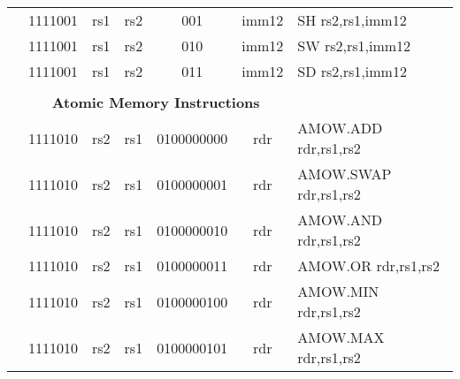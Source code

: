 \begin{table}[p]
\begin{small}
\begin{center}
\begin{tabular}{rcccccccccl}
&
\multicolumn{2}{|c|}{1111001} &
\multicolumn{1}{c|}{rs1} &
\multicolumn{1}{c|}{rs2} &
\multicolumn{1}{c|}{001} &
\multicolumn{4}{c|}{imm12} & SH rs2,rs1,imm12 \\
\cline{2-10}
  

&
\multicolumn{2}{|c|}{1111001} &
\multicolumn{1}{c|}{rs1} &
\multicolumn{1}{c|}{rs2} &
\multicolumn{1}{c|}{010} &
\multicolumn{4}{c|}{imm12} & SW rs2,rs1,imm12 \\
\cline{2-10}
  

&
\multicolumn{2}{|c|}{1111001} &
\multicolumn{1}{c|}{rs1} &
\multicolumn{1}{c|}{rs2} &
\multicolumn{1}{c|}{011} &
\multicolumn{4}{c|}{imm12} & SD rs2,rs1,imm12 \\
\cline{2-10}
  

&
\multicolumn{9}{c}{} & \\
&
\multicolumn{9}{c}{\bf Atomic Memory Instructions} & \\
\cline{2-10}
  

&
\multicolumn{2}{|c|}{1111010} &
\multicolumn{1}{c|}{rs2} &
\multicolumn{1}{c|}{rs1} &
\multicolumn{4}{c|}{0100000000} &
\multicolumn{1}{c|}{rdr} & AMOW.ADD rdr,rs1,rs2 \\
\cline{2-10}
  

&
\multicolumn{2}{|c|}{1111010} &
\multicolumn{1}{c|}{rs2} &
\multicolumn{1}{c|}{rs1} &
\multicolumn{4}{c|}{0100000001} &
\multicolumn{1}{c|}{rdr} & AMOW.SWAP rdr,rs1,rs2 \\
\cline{2-10}
  

&
\multicolumn{2}{|c|}{1111010} &
\multicolumn{1}{c|}{rs2} &
\multicolumn{1}{c|}{rs1} &
\multicolumn{4}{c|}{0100000010} &
\multicolumn{1}{c|}{rdr} & AMOW.AND rdr,rs1,rs2 \\
\cline{2-10}
  

&
\multicolumn{2}{|c|}{1111010} &
\multicolumn{1}{c|}{rs2} &
\multicolumn{1}{c|}{rs1} &
\multicolumn{4}{c|}{0100000011} &
\multicolumn{1}{c|}{rdr} & AMOW.OR rdr,rs1,rs2 \\
\cline{2-10}
  

&
\multicolumn{2}{|c|}{1111010} &
\multicolumn{1}{c|}{rs2} &
\multicolumn{1}{c|}{rs1} &
\multicolumn{4}{c|}{0100000100} &
\multicolumn{1}{c|}{rdr} & AMOW.MIN rdr,rs1,rs2 \\
\cline{2-10}
  

&
\multicolumn{2}{|c|}{1111010} &
\multicolumn{1}{c|}{rs2} &
\multicolumn{1}{c|}{rs1} &
\multicolumn{4}{c|}{0100000101} &
\multicolumn{1}{c|}{rdr} & AMOW.MAX rdr,rs1,rs2 \\
\cline{2-10}
  


\end{tabular}
\end{center}
\end{small}
\end{table}

